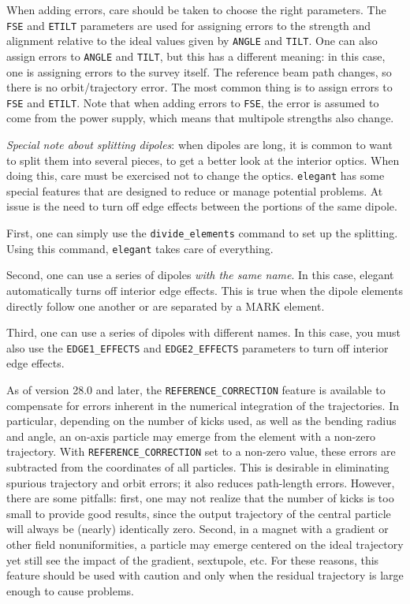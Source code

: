 When adding errors, care should be taken to choose the right
parameters.  The \verb|FSE| and \verb|ETILT| parameters are used for
assigning errors to the strength and alignment relative to the ideal
values given by \verb|ANGLE| and \verb|TILT|.  One can also assign 
errors to \verb|ANGLE| and \verb|TILT|, but this has a different meaning:
in this case, one is assigning errors to the survey itself.  The reference
beam path changes, so there is no orbit/trajectory error. The most common
thing is to assign errors to \verb|FSE| and \verb|ETILT|.  Note that when
adding errors to \verb|FSE|, the error is assumed to come from the power
supply, which means that multipole strengths also change.

{\em Special note about splitting dipoles}: when dipoles are long, it is
common to want to split them into several pieces, to get a better look
at the interior optics.  When doing this, care must be exercised not
to change the optics.  {\tt elegant} has some special features that
are designed to reduce or manage potential problems. At issue is the
need to turn off edge effects between the portions of the same dipole.

First, one can simply use the \verb|divide_elements| command to set up
the splitting.  Using this command, {\tt elegant} takes care of everything.

Second, one can use a series of dipoles {\em with the same name}.  In this case,
elegant automatically turns off interior edge effects.  This is true when the
dipole elements directly follow one another or are separated by a MARK element.

Third, one can use a series of dipoles with different names.  In this case, you
must also use the \verb|EDGE1_EFFECTS| and \verb|EDGE2_EFFECTS| parameters to
turn off interior edge effects.  

As of version 28.0 and later, the \verb|REFERENCE_CORRECTION| feature is available
to compensate for errors inherent in the numerical integration of the trajectories.
In particular, depending on the number of kicks used, as well as the bending radius and angle,
an on-axis particle may emerge from the element with a non-zero trajectory.
With \verb|REFERENCE_CORRECTION| set to a non-zero value, these errors are subtracted from the
coordinates of all particles.
This is desirable in eliminating spurious trajectory and orbit errors; it also reduces path-length
errors.
However, there are some pitfalls: first, one may not realize that the number of kicks is too small to
provide good results, since the output trajectory of the central particle will always be
(nearly) identically zero. Second, in a magnet with a gradient or other field nonuniformities, 
a particle may emerge centered on the ideal trajectory yet still see the impact of the gradient, sextupole, etc.
For these reasons, this feature should be used with caution and only when the residual trajectory is 
large enough to cause problems.
